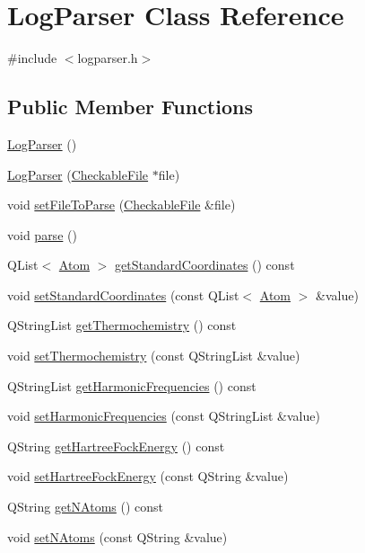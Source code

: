 \hypertarget{class_log_parser}{}\section{Log\+Parser Class Reference}
\label{class_log_parser}


{\ttfamily \#include $<$logparser.\+h$>$}

\subsection*{Public Member Functions}
\begin{DoxyCompactItemize}
\item 
\hyperlink{class_log_parser_ad920ca5d46af8d3689a1541a65397d08}{Log\+Parser} ()
\item 
\hyperlink{class_log_parser_abf05dd6e12f329b442af32c9387f5df0}{Log\+Parser} (\hyperlink{class_checkable_file}{Checkable\+File} $\ast$file)
\item 
void \hyperlink{class_log_parser_a996bf677bb0c4b6966491bf12fac0539}{set\+File\+To\+Parse} (\hyperlink{class_checkable_file}{Checkable\+File} \&file)
\item 
void \hyperlink{class_log_parser_af5e235c8c1233eb13d6631ecfdd212fb}{parse} ()
\item 
Q\+List$<$ \hyperlink{struct_atom}{Atom} $>$ \hyperlink{class_log_parser_ae1d61243d20e3534910bdcfa1b120a1c}{get\+Standard\+Coordinates} () const 
\item 
void \hyperlink{class_log_parser_a29add798425ca3fb9ace1e8d69ead9b5}{set\+Standard\+Coordinates} (const Q\+List$<$ \hyperlink{struct_atom}{Atom} $>$ \&value)
\item 
Q\+String\+List \hyperlink{class_log_parser_a43c32f53d2ee84001bc5598964c550ce}{get\+Thermochemistry} () const 
\item 
void \hyperlink{class_log_parser_a6c5fe30147adfe67efdbc92cb34929eb}{set\+Thermochemistry} (const Q\+String\+List \&value)
\item 
Q\+String\+List \hyperlink{class_log_parser_ae1fee2524455c73e984f058f2398f44a}{get\+Harmonic\+Frequencies} () const 
\item 
void \hyperlink{class_log_parser_ae82ffb40c6a254a4d6c4697d63c36b1a}{set\+Harmonic\+Frequencies} (const Q\+String\+List \&value)
\item 
Q\+String \hyperlink{class_log_parser_a2e51ca38092ebb37dbcd67463c3ee5a1}{get\+Hartree\+Fock\+Energy} () const 
\item 
void \hyperlink{class_log_parser_a39d39fab9dfdb29187359e9dbbfdc879}{set\+Hartree\+Fock\+Energy} (const Q\+String \&value)
\item 
Q\+String \hyperlink{class_log_parser_a5198c448b9e2cf76e2e75f34bea0e90d}{get\+N\+Atoms} () const 
\item 
void \hyperlink{class_log_parser_aaebd75b2bdfc8fb416b1cc7744dae598}{set\+N\+Atoms} (const Q\+String \&value)
\end{DoxyCompactItemize}


